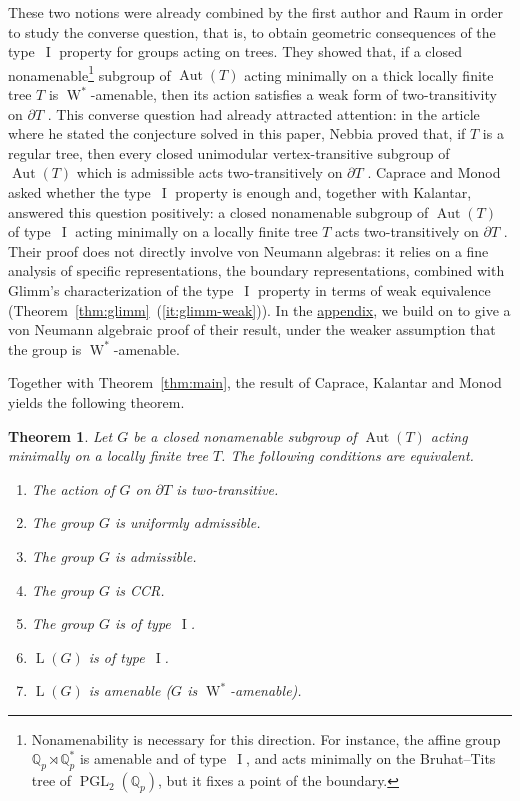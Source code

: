 \documentclass[11pt]{amsart}
\numberwithin{equation}{section}
\newcommand{\qq}{\mathbb Q}
\DeclareMathOperator{\LL}{L}
\DeclareMathOperator{\I}{I}
\DeclareMathOperator{\Aut}{Aut}
\newcommand{\Wstar}{\operatorname{W}^*}
\newtheorem{mainthm}{Theorem}
\theoremstyle{definition}
\begin{document}
These two notions were already combined by the first author and Raum in order to study the converse question, that is, to obtain geometric consequences of the type~$\I$ property for groups acting on trees. They showed that, if a closed nonamenable\footnote{Nonamenability is necessary for this direction. For instance, the affine group $\qq_p\rtimes\qq_p^\ast$ is amenable and of type~$\I$, and acts minimally on the Bruhat--Tits tree of $\operatorname{PGL}_2(\qq_p)$, but it fixes a point of the boundary.} subgroup of $\Aut(T)$ acting minimally on a thick locally finite tree $T$ is $\Wstar$-amenable, then its action satisfies a weak form of two-transitivity on $\partial T$ \cite[Theorem~C]{HR19}. This converse question had already attracted attention: in the article where he stated the conjecture solved in this paper, Nebbia proved that, if $T$ is a regular tree, then every closed unimodular vertex-transitive subgroup of $\Aut(T)$ which is admissible acts two-transitively on $\partial T$ \cite{Ne99}. Caprace and Monod asked whether the type~$\I$ property is enough \cite[Problem~20.8.3]{CM18} and, together with Kalantar, answered this question positively: a closed nonamenable subgroup of $\Aut(T)$ of type~$\I$ acting minimally on a locally finite tree $T$ acts two-transitively on $\partial T$ \cite[Corollary~D]{CKM23}. Their proof does not directly involve von Neumann algebras: it relies on a fine analysis of specific representations, the boundary representations, combined with Glimm's characterization of the type~$\I$ property in terms of weak equivalence (Theorem~\ref{thm:glimm}~\textup{(\ref*{it:glimm-weak})}). In the \hyperref[sec:amenability-boundary]{appendix}, we build on \cite[Theorem~C]{HR19} to give a von Neumann algebraic proof of their result, under the weaker assumption that the group is $\Wstar$-amenable.

Together with Theorem~\ref{thm:main}, the result of Caprace, Kalantar and Monod \cite[Corollary~D]{CKM23} yields the following theorem.

\begin{mainthm}
    \label{thm:equivalences}
    Let $G$ be a closed nonamenable subgroup of $\Aut(T)$ acting minimally on a locally finite tree $T$. The following conditions are equivalent.
    \begin{enumerate}[\rm (i)]
        \item\label{it:eq-two-transitive} The action of $G$ on $\partial T$ is two-transitive.
        \item\label{it:eq-uniform-admissible} The group $G$ is uniformly admissible.
        \item\label{it:eq-admissible} The group $G$ is admissible.
        \item\label{it:eq-ccr} The group $G$ is \textup{CCR}.
        \item\label{it:eq-type-i} The group $G$ is of type~$\I$.
        \item\label{it:eq-vn-type-i} $\LL(G)$ is of type~$\I$.
        \item\label{it:eq-vn-amenable} $\LL(G)$ is amenable \textup{(}$G$ is $\Wstar$-amenable\textup{)}.
    \end{enumerate}
\end{mainthm}
\end{document}
